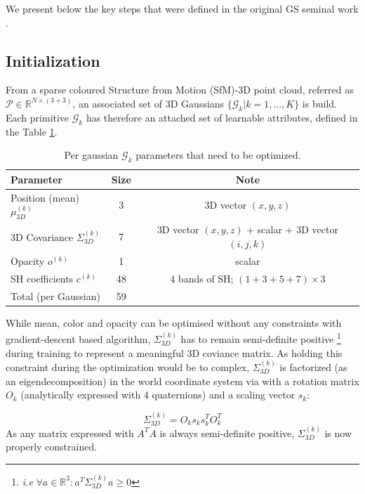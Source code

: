 We present below the key steps that were defined in the original GS seminal work \cite{kerbl20233d}.


\subsection{Initialization} From a sparse coloured Structure from Motion (SfM)-3D point cloud, referred as $\mathcal{P}\in\mathbb{R}^{N\times(3+3)}$, an associated set of 3D Gaussians $\{\mathcal{G}_{k}|k=1,...,K\}$ is build. Each primitive $\mathcal{G}_{k} $ has therefore an attached set of learnable attributes, defined in the Table \ref{tab:gauss-param}. 


\begin{table}[h!]
  \centering
   \caption{Per gaussian $\mathcal{G}_{k} $  parameters that need to be optimized.}
  \begin{tabular}{lcc}
  \hline
  Parameter  & Size & Note \\
  \hline
  Position (mean)  $\mu^{(k)}_{3D}$ & 3 & 3D vector $(x, y, z)$ \\
  3D Covariance $\Sigma^{(k)}_{3D}$ & 7 & 3D vector $(x, y, z)$ + scalar + 3D vector  $(i, j, k)$\\
  Opacity  $o^{(k)}$ & 1 & scalar \\
  SH coefficients  $c^{(k)}$ & 48 & 4 bands of SH; $(1+3+5+7)\times3$ \\
  \hline
  Total (per Gaussian)  & 59 & \\
  \hline
  \end{tabular}
 
  \label{tab:gauss-param}
\end{table}

While mean, color and opacity can be optimised without any constraints with gradient-descent based algorithm, $\Sigma^{(k)}_{3D}$ has to remain semi-definite positive \footnote{\textit{i.e} $ \forall a \in \mathbb{R}^{3}: a^{T}\Sigma^{(k)}_{3D}a \geq 0$} during training to represent a meaningful 3D coviance matrix. As holding this constraint during the optimization would be to complex, $\Sigma^{(k)}_{3D}$ is factorized (as an eigendecomposition) in the world coordinate system via with a rotation matrix $O_{k}$ (analytically expressed with 4 quaternions) and a scaling vector $s_{k}$: 

\begin{equation}
    \Sigma^{(k)}_{3D} = O_{k}s_{k}s_{k}^{T}O_{k}^{T}
\end{equation}
As any matrix expressed with $A^{T}A$ is always semi-definite positive, $\Sigma^{(k)}_{3D}$ is now properly constrained. 

